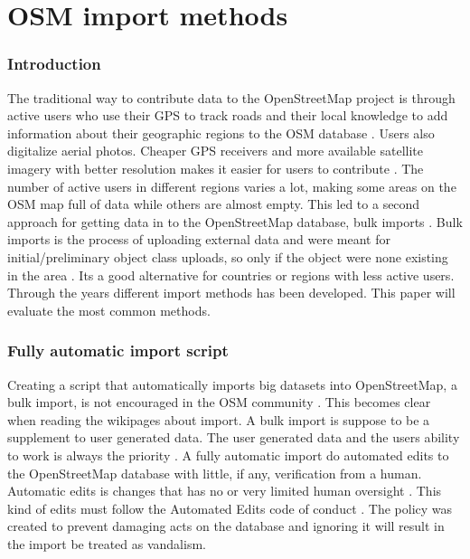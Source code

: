  \chapter{OSM import methods}

\subsection{Introduction}
The traditional way to contribute data to the OpenStreetMap project is through active users who use their GPS to track roads and their local knowledge to add information about their geographic regions to the OSM database \cite{Zielstra2013}. Users also digitalize aerial photos. Cheaper GPS receivers and more available satellite imagery with better resolution makes it easier for users to contribute \cite{Chilton}. The number of active users in different regions varies a lot, making some areas on the OSM map full of data while others are almost empty. This led to a second approach for getting data in to the OpenStreetMap database, bulk imports \cite{Zielstra2013}.  Bulk imports is the process of uploading external data and were meant for initial/preliminary object class uploads, so only if the object were none existing in the area  \cite{Zielstra2013}.  Its a good alternative for countries or regions with less active users. Through the years different import methods has been developed. This paper will evaluate the most common methods. 

\subsection{Fully automatic import script}
Creating a script that automatically imports big datasets into OpenStreetMap, a bulk import, is not encouraged in the OSM community \cite{Zielstra2013}. This becomes clear when reading the wikipages about import. A bulk import is suppose to be a supplement to user generated data. The user generated data and the users ability to work is always the priority \cite{OSMimport}. A fully automatic import do automated edits to the OpenStreetMap database with little, if any, verification from a human. Automatic edits is changes that has no or very limited human oversight \cite{OSMAutiEdit}. This kind of edits must follow the Automated Edits code of conduct \cite{OSMAutomaticEdits}. The policy was created to prevent damaging acts on the database and ignoring it will result in the import be treated as vandalism. 

